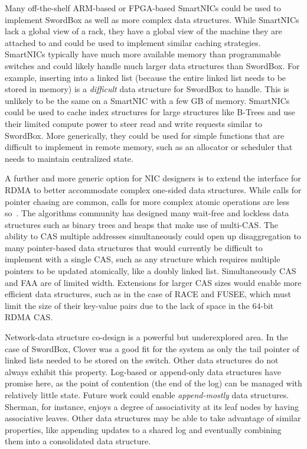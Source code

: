 \documentclass[12pt]{ucsddissertation}
\newcommand{\sword}{SwordBox}
\begin{document}
Many off-the-shelf ARM-based or FPGA-based SmartNICs could be used to implement {\sword} as well as
more complex data structures. While SmartNICs lack a global view of a rack, they have a global view
of the machine they are attached to and could be used to implement similar caching strategies.
SmartNICs typically have much more available memory than programmable switches and could likely
handle much larger data structures than {\sword}. For example, inserting into a linked list (because
the entire linked list needs to be stored in memory) is a \textit{difficult} data structure for
{\sword} to handle. This is unlikely to be the same on a SmartNIC with a few GB of memory. SmartNICs
could be used to cache index structures for large structures like B-Trees and use their limited
compute power to steer read and write requests similar to {\sword}. More generically, they could be
used for simple functions that are difficult to implement in remote memory, such as an allocator or
scheduler that needs to maintain centralized state.

A further and more generic option for NIC designers is to extend the interface for RDMA to better
accommodate complex one-sided data structures. While calls for pointer chasing are common, calls for
more complex atomic operations are less so~\cite{prism, clio}. The algorithms community has designed
many wait-free and lockless data structures such as binary trees and heaps that make use of
multi-CAS. The ability to CAS multiple addresses simultaneously could open up disaggregation to many
pointer-based data structures that would currently be difficult to implement with a single CAS, such
as any structure which requires multiple pointers to be updated atomically, like a doubly linked
list. Simultaneously CAS and FAA are of limited width. Extensions for larger CAS sizes would enable
more efficient data structures, such as in the case of RACE and FUSEE, which must limit the size of
their key-value pairs due to the lack of space in the 64-bit RDMA CAS.

Network-data structure co-design is a powerful but underexplored area. In the case of
{\sword}, Clover was a good fit for the system as only the tail pointer of linked lists needed
to be stored on the switch. Other data structures do not always exhibit this property. Log-based or
append-only data structures have promise here, as the point of contention (the end of the log) can
be managed with relatively little state. Future work could enable \textit{append-mostly} data
structures. Sherman, for instance, enjoys a degree of associativity at its leaf nodes by having
associative leaves. Other data structures may be able to take advantage of similar properties, like
appending updates to a shared log and eventually combining them into a consolidated data structure.
\end{document}
